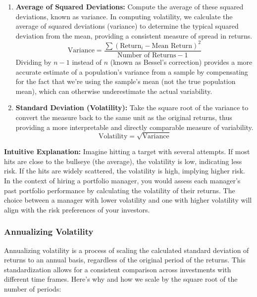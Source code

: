 \documentclass{article}
\begin{document}
\begin{enumerate}
    \item \textbf{Average of Squared Deviations:}
    Compute the average of these squared deviations, known as variance. In computing volatility, we calculate the average of squared deviations (variance) to determine the typical squared deviation from the mean, providing a consistent measure of spread in returns.
    \[ \text{Variance} = \frac{\sum (\text{Return}_i - \text{Mean Return})^2}{\text{Number of Returns} - 1} \]
    Dividing by \( n-1 \) instead of \( n \) (known as Bessel's correction) provides a more accurate estimate of a population's variance from a sample by compensating for the fact that we're using the sample's mean (not the true population mean), which can otherwise underestimate the actual variability.


    \item \textbf{Standard Deviation (Volatility):}
    Take the square root of the variance to convert the measure back to the same unit as the original returns, thus providing a more interpretable and directly comparable measure of variability.
    \[ \text{Volatility} = \sqrt{\text{Variance}} \]
\end{enumerate}

\textbf{Intuitive Explanation:} 
Imagine hitting a target with several attempts. If most hits are close to the bullseye (the average), the volatility is low, indicating less risk. If the hits are widely scattered, the volatility is high, implying higher risk. In the context of hiring a portfolio manager, you would assess each manager's past portfolio performance by calculating the volatility of their returns. The choice between a manager with lower volatility and one with higher volatility will align with the risk preferences of your investors.

\subsubsection{Annualizing Volatility}

Annualizing volatility is a process of scaling the calculated standard deviation of returns to an annual basis, regardless of the original period of the returns. This standardization allows for a consistent comparison across investments with different time frames. Here's why and how we scale by the square root of the number of periods:
\end{document}
